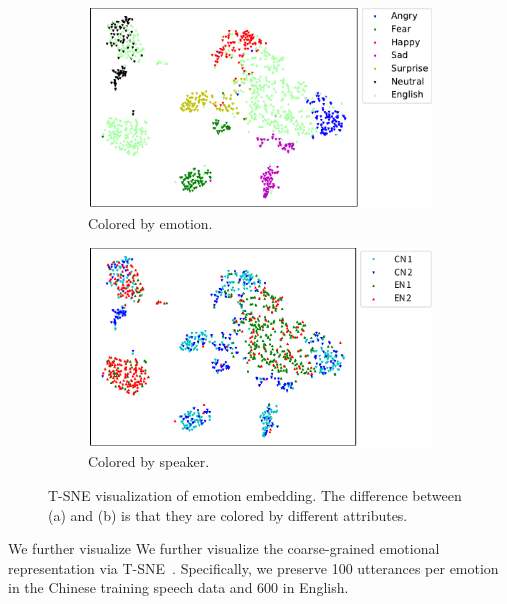 \documentclass[journal,comsoc]{IEEEtran}
\begin{document}
\begin{figure}[htb]
\begin{minipage}[b]{\linewidth}
\centering
\begin{subfigure}[b]{0.9\textwidth}
\centering
\includegraphics[width=\textwidth]{test7.pdf}
\caption{Colored by emotion.}
\vspace{+10pt}
\end{subfigure}
\begin{subfigure}[b]{0.9\textwidth}
\centering
\includegraphics[width=\textwidth]{test_spk1.pdf}
\caption{Colored by speaker.}
\end{subfigure}
\end{minipage}
\caption{T-SNE visualization of emotion embedding. The difference between (a) and (b) is that they are colored by different attributes.}
\label{fig_3}
\end{figure}

We further visualize 
We further visualize the coarse-grained emotional representation via T-SNE~\cite{Maaten2008VisualizingDU}. Specifically, we preserve 100 utterances per emotion in the Chinese training speech data and 600 in English.
\end{document}
